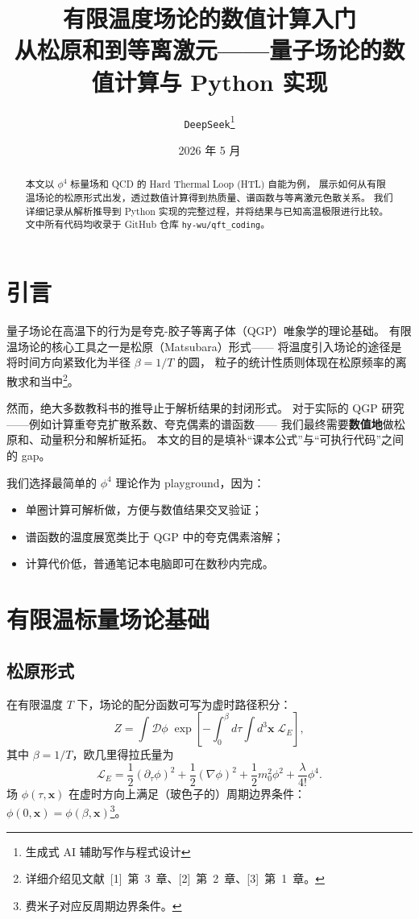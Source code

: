 \documentclass[12pt,a4paper]{article}
\title{\vspace{-2em}\textbf{有限温度场论的数值计算入门}\\
\large 从松原和到等离激元——量子场论的数值计算与 Python 实现}
\author{\texttt{DeepSeek}\footnote{生成式 AI 辅助写作与程式设计}}
\date{2026 年 5 月}
\begin{document}
\maketitle
\vspace{-1em}

\begin{abstract}
本文以 $\phi^4$ 标量场和 QCD 的 Hard Thermal Loop (HTL) 自能为例，
展示如何从有限温场论的松原形式出发，透过数值计算得到热质量、谱函数与等离激元色散关系。
我们详细记录从解析推导到 Python 实现的完整过程，并将结果与已知高温极限进行比较。
文中所有代码均收录于 GitHub 仓库 \texttt{hy-wu/qft\_coding}。
\end{abstract}

\section{引言}

量子场论在高温下的行为是夸克-胶子等离子体（QGP）唯象学的理论基础。
有限温场论的核心工具之一是松原（Matsubara）形式——
将温度引入场论的途径是将时间方向紧致化为半径 $\beta = 1/T$ 的圆，
粒子的统计性质则体现在松原频率的离散求和当中\footnote{详细介绍见文献~[1]~第~3~章、[2]~第~2~章、[3]~第~1~章。}。

然而，绝大多数教科书的推导止于解析结果的封闭形式。
对于实际的 QGP 研究——例如计算重夸克扩散系数、夸克偶素的谱函数——
我们最终需要\textbf{数值地}做松原和、动量积分和解析延拓。
本文的目的是填补“课本公式”与“可执行代码”之间的 gap。

我们选择最简单的 $\phi^4$ 理论作为 playground，因为：
\begin{itemize}[nosep]
\item 单圈计算可解析做，方便与数值结果交叉验证；
\item 谱函数的温度展宽类比于 QGP 中的夸克偶素溶解；
\item 计算代价低，普通笔记本电脑即可在数秒内完成。
\end{itemize}

\section{有限温标量场论基础}

\subsection{松原形式}

在有限温度 $T$ 下，场论的配分函数可写为虚时路径积分：
\begin{equation}
Z = \int \mathcal{D}\phi \; \exp\left[-\int_0^\beta d\tau \int d^3\mathbf{x}\; \mathcal{L}_E\right],
\label{eq:path-integral}
\end{equation}
其中 $\beta = 1/T$，欧几里得拉氏量为
\begin{equation}
\mathcal{L}_E = \frac{1}{2}(\partial_\tau\phi)^2 + \frac{1}{2}(\nabla\phi)^2 + \frac{1}{2}m_0^2\phi^2 + \frac{\lambda}{4!}\phi^4.
\label{eq:lagrangian}
\end{equation}
场 $\phi(\tau, \mathbf{x})$ 在虚时方向上满足（玻色子的）周期边界条件：
$\phi(0, \mathbf{x}) = \phi(\beta, \mathbf{x})$\footnote{费米子对应反周期边界条件。}。
\end{document}
